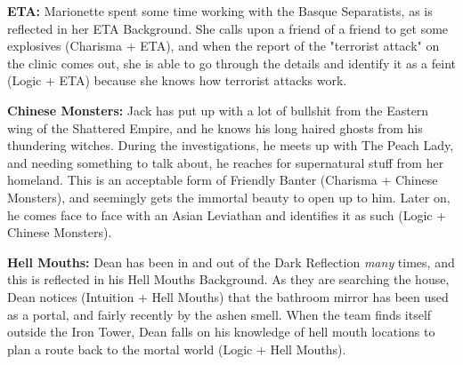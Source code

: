 \hspace{\parindent} \textbf{ETA:} Marionette spent some time working with the Basque Separatists, as is reflected in her ETA Background. She calls upon a friend of a friend to get some explosives (Charisma + ETA), and when the report of the "terrorist attack" on the clinic comes out, she is able to go through the details and identify it as a feint (Logic + ETA) because she knows how terrorist attacks work.

\textbf{Chinese Monsters:} Jack has put up with a lot of bullshit from the Eastern wing of the Shattered Empire, and he knows his long haired ghosts from his thundering witches. During the investigations, he meets up with The Peach Lady, and needing something to talk about, he reaches for supernatural stuff from her homeland. This is an acceptable form of Friendly Banter (Charisma + Chinese Monsters), and seemingly gets the immortal beauty to open up to him. Later on, he comes face to face with an Asian Leviathan and identifies it as such (Logic + Chinese Monsters).

\textbf{Hell Mouths:} Dean has been in and out of the Dark Reflection \textit{many} times, and this is reflected in his Hell Mouths Background. As they are searching the house, Dean notices (Intuition + Hell Mouths) that the bathroom mirror has been used as a portal, and fairly recently by the ashen smell. When the team finds itself outside the Iron Tower, Dean falls on his knowledge of hell mouth locations to plan a route back to the mortal world (Logic + Hell Mouths).
